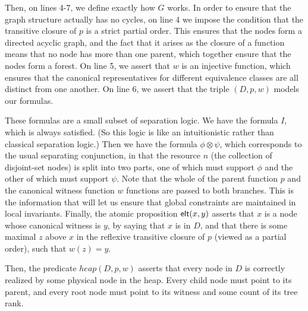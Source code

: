 Then, on lines 4-7, we define exactly how $G$ works. In order to
ensure that the graph structure actually has no cycles, on line 4 we
impose the condition that the transitive closure of $p$ is a strict
partial order. This ensures that the nodes form a directed acyclic
graph, and the fact that it arises as the closure of a function means
that no node has more than one parent, which together ensure that the
nodes form a forest. On line 5, we assert that $w$ is an injective
function, which ensures that the canonical representatives for different
equivalence classes are all distinct from one another. On line 6, we
assert that the triple $(D, p, w)$ models our formulas.

These formulas are a small subset of separation logic. We have the
formula $I$, which is always satisfied. (So this logic is like an
intuitionistic rather than classical separation logic.) Then we have
the formula $\phi \otimes \psi$, which corresponds to the usual
separating conjunction, in that the resource $n$ (the collection of
disjoint-set nodes) is split into two parts, one of which must support
$\phi$ and the other of which must support $\psi$. Note that the whole
of the parent function $p$ and the canonical witness function $w$
functions are passed to both branches. This is the information that
will let us ensure that global constraints are maintained in local
invariants. Finally, the atomic proposition $\mathsf{elt}({x}, {y})$ asserts that
$x$ is a node whose canonical witness is $y$, by saying that $x$ is in
$D$, and that there is some maximal $z$ above $x$ in the reflexive
transitive closure of $p$ (viewed as a partial order), such that $w(z)
= y$.

Then, the predicate $\mathit{heap}(D, p, w)$ asserts that every node
in $D$ is correctly realized by some physical node in the heap. Every
child node must point to its parent, and every root node must point 
to its witness and some count of its tree rank. 

